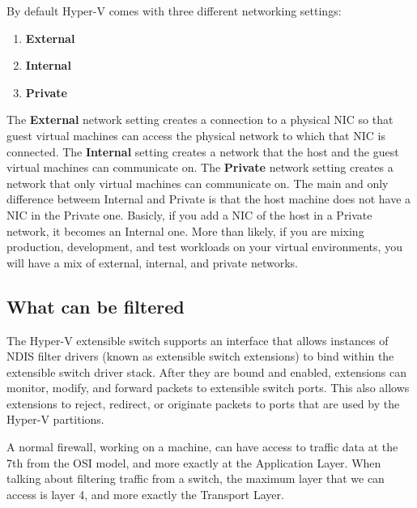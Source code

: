 By default Hyper-V comes with three different networking settings: 
\vspace{5mm}

\begin{enumerate}
\item \textbf{External}
\item \textbf{Internal}
\item \textbf{Private} 
\end{enumerate}

\vspace{5mm}
The \textbf{External} network setting creates a connection to a physical NIC so that guest virtual machines can access the physical network to which that NIC is connected. 
\vspace{5mm}
The \textbf{Internal} setting creates a network that the host and the guest virtual machines can communicate on. 
\vspace{5mm}
The \textbf{Private} network setting creates a network that only virtual 
machines can communicate on. 
\vspace{5mm}
The main and only difference betweem Internal and Private is that the host machine does not have a NIC in the Private one. Basicly, if you add a NIC of the 
host in a Private network, it becomes an Internal one. More than likely, if you are mixing production, development, and test workloads on your virtual environments, you will have a mix 
of external, internal, and private networks.

\vspace{5mm}
\subsection{What can be filtered}
\vspace{5mm}

The Hyper-V extensible switch supports an interface that allows instances of NDIS filter drivers (known as extensible switch extensions) to bind within the extensible switch driver stack. 
After they are bound and enabled, extensions can monitor, modify, and forward packets to extensible switch ports. This also allows extensions to reject, redirect, or originate packets to 
ports that are used by the Hyper-V partitions.

\vspace{5mm}

A normal firewall, working on a machine, can have access to traffic data at the 7th from the OSI model, and more exactly at the Application Layer.
When talking about filtering traffic from a switch, the maximum layer that we can access is layer 4, and more exactly the Transport Layer.

